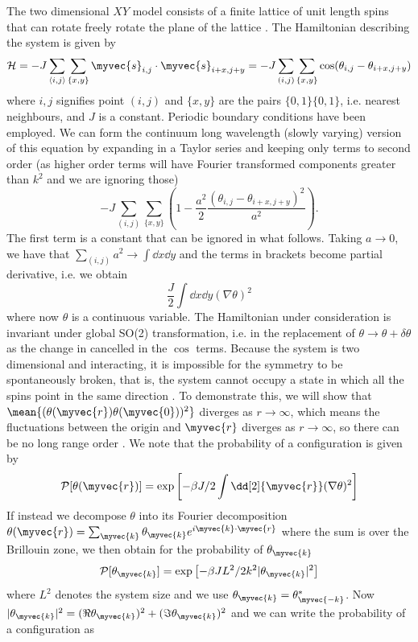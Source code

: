The two dimensional $XY$ model consists of a finite lattice of unit length spins that can rotate freely rotate the plane of the lattice \cite{altland2010condensed}. The Hamiltonian describing the system is given by 
\[ 
\mathcal{H} = -J\sum_{\left <i,j \right>} \sum_{\{x,y\}} \myvec{s}_{i,j} \cdot \myvec{s}_{i+x,j+y} =
    -J\sum_{(i,j)} \sum_{\{x,y\}}  \cos( \theta_{i,j} - \theta_{i+x,j+y}) 
\]
 where $i, j$ signifies point $(i,j)$ and $\{x,y\}$ are the pairs $\{0,1\} \{0,1\}$, i.e. nearest neighbours, and $J$ is a constant. Periodic boundary conditions have been employed. We can form the continuum long wavelength (slowly varying) version of this equation by expanding in a Taylor series and keeping only terms to second order (as higher order terms will have Fourier transformed components greater than $k^2$ and we are ignoring those)
 \[
 -J\sum_{(i,j)} \sum_{\{x,y\}} \left ( 1 - \frac{a^2}{2} \frac{( \theta_{i,j} - \theta_{i+x,j+y})^2}{a^2} \right).
 \]
The first term is a constant that can be ignored in what follows. Taking $a \to 0$, we have that $\sum_{(i,j)} a^2 \to \int \dd{x}\dd{y}$ and the terms in brackets become partial derivative, i.e. we obtain
 \[
 \frac{J}{2} \int \dd{x} \dd{y} (\nabla \theta)^2
 \]
 where now $\theta$ is a continuous variable. The Hamiltonian under consideration is invariant under global SO(2) transformation, i.e. in the replacement of $\theta \to \theta + \delta \theta$ as the change in cancelled in the $\cos$ terms. Because the system is two dimensional and interacting, it is impossible for the symmetry to be spontaneously broken, that is, the system cannot occupy a state in which all the spins point in the same direction \cite{Coleman1973}. To demonstrate this, we will show that $\mean{(\theta(\myvec{r})\theta(\myvec{0}))^2}$ diverges as $r \to \infty$, which means the fluctuations between the origin and $\myvec{r}$ diverges as $r \to \infty$, so there can be no long range order \cite{8.334 lecture notes}. We note that the probability of a configuration is given by 
 \[
  \mathcal{P}[\theta(\myvec{r})] =   \exp \left [   -\beta J/2 \int \dd[2]{\myvec{r}} (\nabla \theta)^2 \right ]
 \] 
 If instead we decompose  $\theta$ into its Fourier decomposition $\theta(\myvec{r}) = \sum_{\myvec{k}} \theta_{\myvec{k}} e^{i \myvec{k}\cdot \myvec{r}}$ where the sum is over the Brillouin zone, we then obtain for the probability of $\theta_{\myvec{k}}$
 \[
 \mathcal{P}[\theta_{\myvec{k}}] = \exp \left[-\beta J L^2/2 k^2 |\theta_{\myvec{k}}|^2 \right]
 \]
 where $L^2$ denotes the system size and we use $\theta_{\myvec{k}} = \theta_{\myvec{-k}}^*$. Now $|\theta_{\myvec{k}}|^2 = (\Re \theta_{\myvec{k}})^2 + (\Im \theta_{\myvec{k}})^2$ and we can write the probability of a configuration as 
